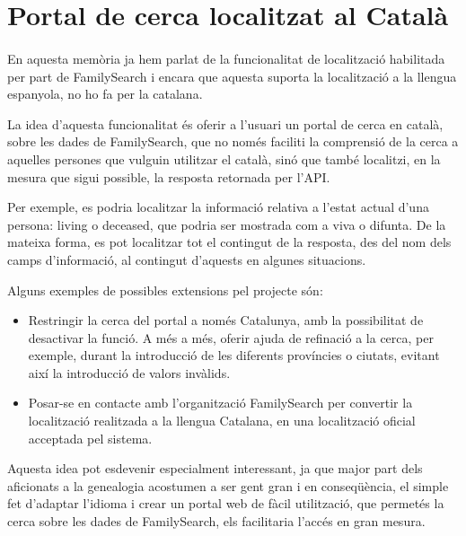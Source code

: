 \section{Portal de cerca localitzat al Català}

    \paragraph{}
    En aquesta memòria ja hem parlat de la funcionalitat de localització habilitada per part de FamilySearch i encara que aquesta suporta la localització a la llengua espanyola, no ho fa per la catalana.

    La idea d'aquesta funcionalitat és oferir a l'usuari un portal de cerca en català, sobre les dades de FamilySearch, que no només faciliti la comprensió de la cerca a aquelles persones que vulguin utilitzar el català, sinó que també localitzi, en la mesura que sigui possible, la resposta retornada per l'API.

    Per exemple, es podria localitzar la informació relativa a l'estat actual d'una persona: living o deceased, que podria ser mostrada com a viva o difunta. De la mateixa forma, es pot localitzar tot el contingut de la resposta, des del nom dels camps d'informació, al contingut d'aquests en algunes situacions.

    Alguns exemples de possibles extensions pel projecte són:

    \begin{itemize}
        \item Restringir la cerca del portal a només Catalunya, amb la possibilitat de desactivar la funció. A més a més, oferir ajuda de refinació a la cerca, per exemple, durant la introducció de les diferents províncies o ciutats, evitant així la introducció de valors invàlids.
        \item Posar-se en contacte amb l'organització FamilySearch per convertir la lo\-ca\-lit\-za\-ció realitzada a la llengua Catalana, en una localització oficial acceptada pel sistema.
    \end{itemize}

    Aquesta idea pot esdevenir especialment interessant, ja que major part dels aficionats a la genealogia acostumen a ser gent gran i en conseqüència, el simple fet d'adaptar l'idioma i crear un portal web de fàcil utilització, que permetés la cerca sobre les dades de FamilySearch, els facilitaria l'accés en gran mesura.
